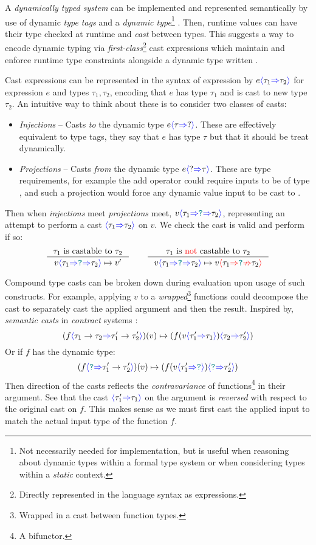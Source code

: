 A \textit{dynamically typed system} can be implemented and represented semantically by use of dynamic \textit{type tags} and a \textit{dynamic type}\footnote{Not necessarily needed for implementation, but is useful when reasoning about dynamic types within a formal type system or when considering types within a \textit{static} context.} \cite{DynamicTyping}. Then, runtime values can have their type checked at runtime and \textit{cast} between types. This suggests a way to encode dynamic typing via \textit{first-class}\footnote{Directly represented in the language syntax as expressions.} cast expressions which maintain and enforce runtime type constraints alongside a dynamic type written \dyn.

Cast expressions can be represented in the syntax of expression by $e{\color{blue}\langle} \tau_1 {\color{blue}\Rightarrow} \tau_2 {\color{blue}\rangle}$ for expression $e$ and types $\tau_1, \tau_2$, encoding that $e$ has type $\tau_1$ and is cast to new type $\tau_2$. An intuitive way to think about these is to consider two classes of casts:
\begin{itemize}
\item \textit{Injections} -- Casts \textit{to} the dynamic type $e{\color{blue}\langle} \tau {\color{blue}\Rightarrow} ? {\color{blue}\rangle}$. These are effectively equivalent to type tags, they say that $e$ has type $\tau$ but that it should be treat dynamically.
\item \textit{Projections} -- Casts \textit{from} the dynamic type $e{\color{blue}\langle} ? {\color{blue}\Rightarrow} \tau {\color{blue}\rangle}$. These are type requirements, for example the add operator could require inputs to be of type , and such a projection would force any dynamic value input to be cast to . 
\end{itemize}
Then when \textit{injections} meet \textit{projections} meet, $v{\color{blue}\langle} \tau_1 {\color{blue}\Rightarrow} {\color{teal}\texttt{?}} {\color{blue}\Rightarrow} \tau_2 {\color{blue}\rangle}$, representing an attempt to perform a cast ${\color{blue}\langle} \tau_1 {\color{blue}\Rightarrow} \tau_2 {\color{blue}\rangle}$ on $v$. We check the cast is valid and perform if so:
\[\inference{\tau_1 \text{ is castable to } \tau_2}{v\scastcast{\tau_1}{\dyn}{\tau_2} \mapsto v'} \qquad \inference{\tau_1  \text{ is {\color{red} not }castable to }  \tau_2}{v\scastcast{\tau_1}{\dyn}{\tau_2} \mapsto v\scasterror{\tau_1}{\tau_2}}\]


Compound type casts can be broken down during evaluation upon usage of such constructs. For example, applying $v$ to a \textit{wrapped}\footnote{Wrapped in a cast between function types.} functions could decompose the cast to separately cast the applied argument and then the result. Inspired by, \textit{semantic casts} \cite{SemanticCasts} in \textit{contract} systems \cite{Contracts}:
\[(f{\color{blue}\langle} \tau_1 \to \tau_2 {\color{blue}\Rightarrow} \tau_1' \to \tau_2' {\color{blue}\rangle})(v) \mapsto (f(v {\color{blue}\langle} \tau_1' {\color{blue}\Rightarrow} \tau_1 {\color{blue}\rangle}){\color{blue}\langle} \tau_2 {\color{blue}\Rightarrow} \tau_2' {\color{blue}\rangle})\]
Or if $f$ has the dynamic type:
\[(f{\color{blue}\langle} {\color{teal}\texttt{?}} {\color{blue}\Rightarrow} \tau_1' \to \tau_2' {\color{blue}\rangle})(v) \mapsto (f(v {\color{blue}\langle} \tau_1' {\color{blue}\Rightarrow} {\color{teal}\texttt{?}} {\color{blue}\rangle}){\color{blue}\langle} {\color{teal}\texttt{?}} {\color{blue}\Rightarrow} \tau_2' {\color{blue}\rangle})\]
Then direction of the casts reflects the \textit{contravariance} \cite[ch. 2]{BasicCatTheory} of functions\footnote{A bifunctor.} in their argument.
See that the cast ${\color{blue}\langle} \tau_1' {\color{blue}\Rightarrow} \tau_1 {\color{blue}\rangle}$ on the argument is \textit{reversed} with respect to the original cast on $f$. This makes sense as we must first cast the applied input to match the actual input type of the function $f$.

